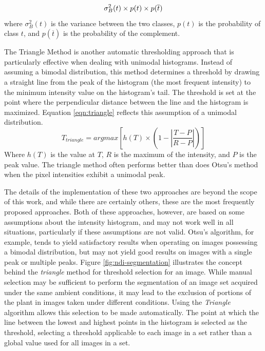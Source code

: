 \documentclass[letterpaper, notitlepage]{report}
\begin{document}
{%
\begin{equation}\label{eqn:otsu}
\sigma^2_B (t) \times p(t) \times p(\overline{t}) \\
\end{equation}
where $\sigma^2_B (t)$ is the variance between the two classes, $p(t)$ is the probability of class $t$, and $p(\overline{t})$ is the probability of the complement.

The Triangle Method is another automatic thresholding approach that is particularly effective when dealing with unimodal histograms. Instead of assuming a bimodal distribution, this method determines a threshold by drawing a straight line from the peak of the histogram (the most frequent intensity) to the minimum intensity value on the histogram’s tail. The threshold is set at the point where the perpendicular distance between the line and the histogram is maximized. Equation \ref{eqn:triangle} reflects this assumption of a unimodal distribution.
\begin{equation}\label{eqn:triangle}
T_{triangle} = argmax \left[ h(T) \times \left( 1 - \left| \frac{T - P}{R - P} \right| \right) \right]
\end{equation}
Where $h(T)$ is the value at $T$, $R$ is the maximum of the intensity, and $P$ is the peak value. The triangle method often performs better than does Otsu's method when the pixel intensities exhibit a unimodal peak.

The details of the implementation of these two approaches are beyond the scope of this work, and while there are certainly others, these are the most frequently proposed approaches. Both of these approaches, however, are based on some assumptions about the intensity histogram, and may not work well in all situations, particularly if these assumptions are not valid. Otsu's algorithm, for example, tends to yield satisfactory results when operating on images possessing a bimodal distribution, but may not yield good results on images with a single peak or multiple peaks. Figure \ref{fig:ndi-segmentation} illustrates the concept behind the \textit{triangle} method for threshold selection for an image. While manual selection may be sufficient to perform the segmentation of an image set acquired under the same ambient conditions, it may lead to the exclusion of portions of the plant in images taken under different conditions. Using the \textit{Triangle} algorithm \parencite{Brink1996-xy,Zack1977-yl} allows this selection to be made automatically. The point at which the line between the lowest and highest points in the histogram is selected as the threshold, selecting a threshold applicable to each image in a set rather than a global value used for all images in a set.

}
\end{document}
